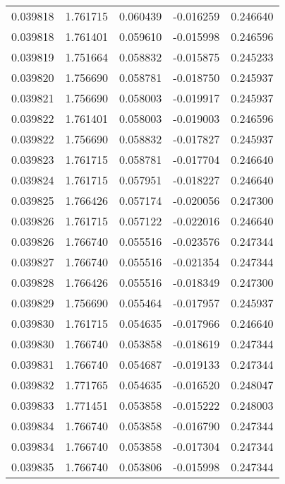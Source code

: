 \begin{tabular}{lrrrr}
0.039818    &  1.761715 &  0.060439 & -0.016259 &             0.246640 \\
0.039818    &  1.761401 &  0.059610 & -0.015998 &             0.246596 \\
0.039819    &  1.751664 &  0.058832 & -0.015875 &             0.245233 \\
0.039820    &  1.756690 &  0.058781 & -0.018750 &             0.245937 \\
0.039821    &  1.756690 &  0.058003 & -0.019917 &             0.245937 \\
0.039822    &  1.761401 &  0.058003 & -0.019003 &             0.246596 \\
0.039822    &  1.756690 &  0.058832 & -0.017827 &             0.245937 \\
0.039823    &  1.761715 &  0.058781 & -0.017704 &             0.246640 \\
0.039824    &  1.761715 &  0.057951 & -0.018227 &             0.246640 \\
0.039825    &  1.766426 &  0.057174 & -0.020056 &             0.247300 \\
0.039826    &  1.761715 &  0.057122 & -0.022016 &             0.246640 \\
0.039826    &  1.766740 &  0.055516 & -0.023576 &             0.247344 \\
0.039827    &  1.766740 &  0.055516 & -0.021354 &             0.247344 \\
0.039828    &  1.766426 &  0.055516 & -0.018349 &             0.247300 \\
0.039829    &  1.756690 &  0.055464 & -0.017957 &             0.245937 \\
0.039830    &  1.761715 &  0.054635 & -0.017966 &             0.246640 \\
0.039830    &  1.766740 &  0.053858 & -0.018619 &             0.247344 \\
0.039831    &  1.766740 &  0.054687 & -0.019133 &             0.247344 \\
0.039832    &  1.771765 &  0.054635 & -0.016520 &             0.248047 \\
0.039833    &  1.771451 &  0.053858 & -0.015222 &             0.248003 \\
0.039834    &  1.766740 &  0.053858 & -0.016790 &             0.247344 \\
0.039834    &  1.766740 &  0.053858 & -0.017304 &             0.247344 \\
0.039835    &  1.766740 &  0.053806 & -0.015998 &             0.247344 \\

\end{tabular}
